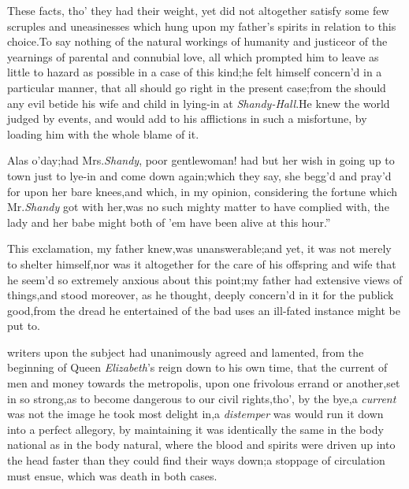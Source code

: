 \documentclass{article}
\begin{document}
These facts, tho’ they had their weight, yet did not
altogether satisfy some few scruples and uneasinesses which hung
upon my father’s spirits in relation to this choice.\tsk  To
say nothing of the natural workings of humanity and
justice\tsk  or of the yearnings of parental and connubial love,
all which prompted him to leave as little to hazard as possible in a case of this
kind;\tsh  he felt himself concern’d in a particular
manner, that all should go right in the present case;\tsk  from
the
should any evil betide his
wife and child in lying-in at \textit{Shandy-Hall}.\tsh  He
knew the world judged by events, and would add to his afflictions
in such a misfortune, by loading him with the whole blame of
it.\tsh 
\begin{story}{Alas o’day;\tsk had Mrs.\@ \textit{Shandy},}
    poor gentlewoman! had but her wish in going up to
town just to lye-in and come down again;\tsk  which they say, she
begg’d and pray’d for upon her bare knees,\tsh  and which,
in my opinion, considering the fortune which Mr.\@ \textit{Shandy} got
with her,\tsk  was no such mighty matter to have complied with,
the lady and her babe might both of ’em have been alive at this
hour.”
\end{story}

\vspace\parskip
This exclamation, my father knew,\break was unanswerable;\tsk  and
yet, it was not merely to shelter himself,\tsk  nor was it
altogether for the care of his offspring and wife that he seem’d so
extremely anxious about this point;\tsk  my father had extensive
views of things,\tsh  and stood moreover, as he thought,
deeply concern’d in it for the publick good,\break from the dread he
entertained of the bad uses an ill-fated instance might be put
to.

\noindent
{}
writers upon the subject
had unanimous\-ly agreed and lamented, from the beginning of Queen
\textit{Elizabeth}’s reign down to his own time, that the
current of men and money towards the metropolis, upon one frivolous
errand or another,\tsh set in so strong,\tsh  as to become
dangerous to our civil rights,\tsk  tho’, by the
bye,\tsh  a \textit{current} was not the image he took most
delight in,\tsk  a \textit{distemper} was
would run it down into a perfect allegory, by
maintaining it was identically the same in the body national as in
the body natural, where the blood and spirits were driven up into
the head faster than they could find their ways
down;\tsh  a stoppage of circulation must ensue, which was
death in both cases.
\end{document}
